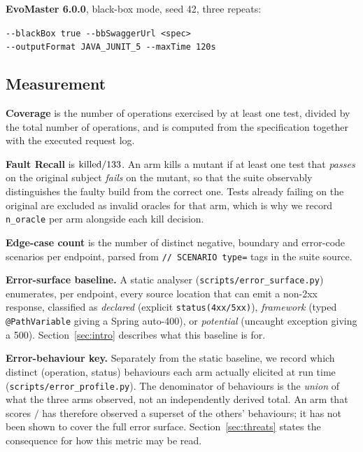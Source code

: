 \textbf{EvoMaster 6.0.0}, black-box mode, seed 42, three repeats:

\begin{center}
\texttt{-{}-blackBox true -{}-bbSwaggerUrl <spec>}\\
\texttt{-{}-outputFormat JAVA\_JUNIT\_5 -{}-maxTime 120s}
\end{center}

\subsection{Measurement}

\textbf{Coverage} is the number of operations exercised by at least one test, divided by the
total number of operations, and is computed from the specification together with the executed
request log.

\textbf{Fault Recall} is $\text{killed}/133{}$. An arm kills a mutant if at least one test
that \emph{passes} on the original subject \emph{fails} on the mutant, so that the suite
observably distinguishes the faulty build from the correct one. Tests already failing on the
original are excluded as invalid oracles for that arm, which is why we record
\texttt{n\_oracle} per arm alongside each kill decision.

\textbf{Edge-case count} is the number of distinct negative, boundary and error-code scenarios
per endpoint, parsed from \texttt{// SCENARIO type=} tags in the suite source.

\textbf{Error-surface baseline.} A static analyser (\texttt{scripts/error\_surface.py})
enumerates, per endpoint, every source location that can emit a non-2xx response, classified
as \emph{declared} (explicit \texttt{status(4xx/5xx)}), \emph{framework} (typed
\texttt{@PathVariable} giving a Spring auto-400), or \emph{potential} (uncaught exception
giving a 500). Section~\ref{sec:intro} describes what this baseline is for.

\textbf{Error-behaviour key.} Separately from the static baseline, we record which distinct
(operation, status) behaviours each arm actually elicited at run time
(\texttt{scripts/error\_profile.py}). The denominator of \PDerrKey{} behaviours is the
\emph{union} of what the three arms observed, not an independently derived total. An arm that
scores \PDerrKey{}$/$\PDerrKey{} has therefore observed a superset of the others' behaviours;
it has not been shown to cover the full error surface. Section~\ref{sec:threats} states the
consequence for how this metric may be read.

